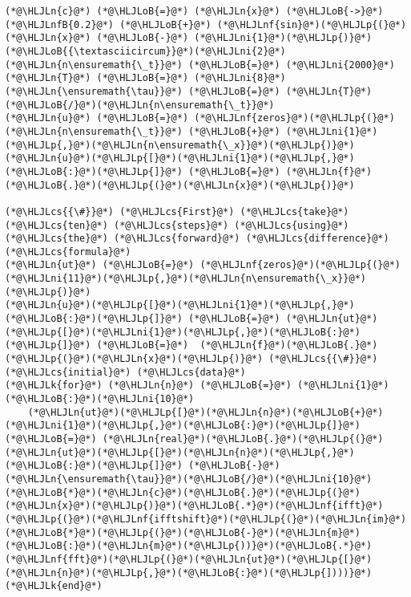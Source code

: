 \documentclass[12pt,a4paper]{article}
\newcommand{\HLJLk}[1]{\textcolor[RGB]{148,91,176}{\textbf{#1}}}
\newcommand{\HLJLn}[1]{#1}
\newcommand{\HLJLnf}[1]{\textcolor[RGB]{66,102,213}{#1}}
\newcommand{\HLJLnfB}[1]{\textcolor[RGB]{59,151,46}{#1}}
\newcommand{\HLJLni}[1]{\textcolor[RGB]{59,151,46}{#1}}
\newcommand{\HLJLoB}[1]{\textcolor[RGB]{102,102,102}{\textbf{#1}}}
\newcommand{\HLJLp}[1]{#1}
\newcommand{\HLJLcs}[1]{\textcolor[RGB]{153,153,119}{\textit{#1}}}
\begin{document}
\begin{lstlisting}
(*@\HLJLn{c}@*) (*@\HLJLoB{=}@*) (*@\HLJLn{x}@*) (*@\HLJLoB{->}@*) (*@\HLJLnfB{0.2}@*) (*@\HLJLoB{+}@*) (*@\HLJLnf{sin}@*)(*@\HLJLp{(}@*)(*@\HLJLn{x}@*) (*@\HLJLoB{-}@*) (*@\HLJLni{1}@*)(*@\HLJLp{)}@*)(*@\HLJLoB{{\textasciicircum}}@*)(*@\HLJLni{2}@*)
(*@\HLJLn{n\ensuremath{\_t}}@*) (*@\HLJLoB{=}@*) (*@\HLJLni{2000}@*)
(*@\HLJLn{T}@*) (*@\HLJLoB{=}@*) (*@\HLJLni{8}@*)
(*@\HLJLn{\ensuremath{\tau}}@*) (*@\HLJLoB{=}@*) (*@\HLJLn{T}@*)(*@\HLJLoB{/}@*)(*@\HLJLn{n\ensuremath{\_t}}@*)
(*@\HLJLn{u}@*) (*@\HLJLoB{=}@*) (*@\HLJLnf{zeros}@*)(*@\HLJLp{(}@*)(*@\HLJLn{n\ensuremath{\_t}}@*) (*@\HLJLoB{+}@*) (*@\HLJLni{1}@*)(*@\HLJLp{,}@*)(*@\HLJLn{n\ensuremath{\_x}}@*)(*@\HLJLp{)}@*)
(*@\HLJLn{u}@*)(*@\HLJLp{[}@*)(*@\HLJLni{1}@*)(*@\HLJLp{,}@*)(*@\HLJLoB{:}@*)(*@\HLJLp{]}@*) (*@\HLJLoB{=}@*) (*@\HLJLn{f}@*)(*@\HLJLoB{.}@*)(*@\HLJLp{(}@*)(*@\HLJLn{x}@*)(*@\HLJLp{)}@*) 

(*@\HLJLcs{{\#}}@*) (*@\HLJLcs{First}@*) (*@\HLJLcs{take}@*) (*@\HLJLcs{ten}@*) (*@\HLJLcs{steps}@*) (*@\HLJLcs{using}@*) (*@\HLJLcs{the}@*) (*@\HLJLcs{forward}@*) (*@\HLJLcs{difference}@*) (*@\HLJLcs{formula}@*)
(*@\HLJLn{ut}@*) (*@\HLJLoB{=}@*) (*@\HLJLnf{zeros}@*)(*@\HLJLp{(}@*)(*@\HLJLni{11}@*)(*@\HLJLp{,}@*)(*@\HLJLn{n\ensuremath{\_x}}@*)(*@\HLJLp{)}@*)
(*@\HLJLn{u}@*)(*@\HLJLp{[}@*)(*@\HLJLni{1}@*)(*@\HLJLp{,}@*)(*@\HLJLoB{:}@*)(*@\HLJLp{]}@*) (*@\HLJLoB{=}@*) (*@\HLJLn{ut}@*)(*@\HLJLp{[}@*)(*@\HLJLni{1}@*)(*@\HLJLp{,}@*)(*@\HLJLoB{:}@*)(*@\HLJLp{]}@*) (*@\HLJLoB{=}@*)  (*@\HLJLn{f}@*)(*@\HLJLoB{.}@*)(*@\HLJLp{(}@*)(*@\HLJLn{x}@*)(*@\HLJLp{)}@*) (*@\HLJLcs{{\#}}@*) (*@\HLJLcs{initial}@*) (*@\HLJLcs{data}@*)
(*@\HLJLk{for}@*) (*@\HLJLn{n}@*) (*@\HLJLoB{=}@*) (*@\HLJLni{1}@*)(*@\HLJLoB{:}@*)(*@\HLJLni{10}@*)
    (*@\HLJLn{ut}@*)(*@\HLJLp{[}@*)(*@\HLJLn{n}@*)(*@\HLJLoB{+}@*)(*@\HLJLni{1}@*)(*@\HLJLp{,}@*)(*@\HLJLoB{:}@*)(*@\HLJLp{]}@*) (*@\HLJLoB{=}@*) (*@\HLJLn{real}@*)(*@\HLJLoB{.}@*)(*@\HLJLp{(}@*)(*@\HLJLn{ut}@*)(*@\HLJLp{[}@*)(*@\HLJLn{n}@*)(*@\HLJLp{,}@*)(*@\HLJLoB{:}@*)(*@\HLJLp{]}@*) (*@\HLJLoB{-}@*) (*@\HLJLn{\ensuremath{\tau}}@*)(*@\HLJLoB{/}@*)(*@\HLJLni{10}@*)(*@\HLJLoB{*}@*)(*@\HLJLn{c}@*)(*@\HLJLoB{.}@*)(*@\HLJLp{(}@*)(*@\HLJLn{x}@*)(*@\HLJLp{)}@*)(*@\HLJLoB{.*}@*)(*@\HLJLnf{ifft}@*)(*@\HLJLp{(}@*)(*@\HLJLnf{ifftshift}@*)(*@\HLJLp{(}@*)(*@\HLJLn{im}@*)(*@\HLJLoB{*}@*)(*@\HLJLp{(}@*)(*@\HLJLoB{-}@*)(*@\HLJLn{m}@*)(*@\HLJLoB{:}@*)(*@\HLJLn{m}@*)(*@\HLJLp{))}@*)(*@\HLJLoB{.*}@*)(*@\HLJLnf{fft}@*)(*@\HLJLp{(}@*)(*@\HLJLn{ut}@*)(*@\HLJLp{[}@*)(*@\HLJLn{n}@*)(*@\HLJLp{,}@*)(*@\HLJLoB{:}@*)(*@\HLJLp{])))}@*)
(*@\HLJLk{end}@*)


\end{lstlisting}
\end{document}
